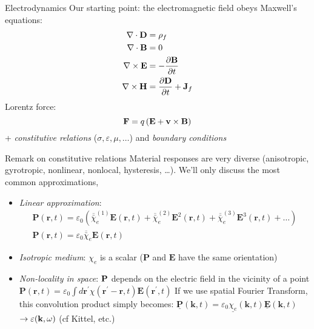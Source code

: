 \documentclass{article}
\providecommand{\tightlist}{}
\begin{document}
\begin{frame}{Electrodynamics}
\protect\hypertarget{electrodynamics}{}
Our starting point: the electromagnetic field obeys Maxwell's equations:
\[
\begin{aligned}
\nabla\cdot\mathbf{D} &= \rho_f\\
\nabla\cdot\mathbf{B} &= 0\\
\nabla\times\mathbf{E} &= -\frac{\partial\mathbf{B}}{\partial t}\\
\nabla\times\mathbf{H} &= \frac{\partial\mathbf{D}}{\partial t} + \mathbf{J}_f
\end{aligned}
\] Lorentz force: \[
\mathbf{F} = q\left(\mathbf{E} + \mathbf{v} \times \mathbf{B}\right)
\] + \emph{constitutive relations} (\(\sigma, \varepsilon, \mu,\dots\))
and \emph{boundary conditions}
\end{frame}

\begin{frame}{Remark on constitutive relations}
\protect\hypertarget{remark-on-constitutive-relations}{}
Material responses are very diverse (anisotropic, gyrotropic, nonlinear,
nonlocal, hysteresis, \dots). We'll only discuss the most common
approximations,

\begin{itemize}
\tightlist
\item
  \emph{Linear approximation}: \[
  \begin{array}{l}
  \mathbf{P}(\mathbf{r}, t)=\varepsilon_{0}\left(\overline{\bar{\chi}}_{e}^{(1)} \mathbf{E}(\mathbf{r}, t)+\overline{\bar{\chi}}_{e}^{(2)} \mathbf{E}^{2}(\mathbf{r}, t)+\overline{\bar{\chi}}_{e}^{(3)} \mathbf{E}^{3}(\mathbf{r}, t)+\ldots\right) \\
  \mathbf{P}(\mathbf{r}, t)=\varepsilon_{0} \overline{\bar{\chi}}_{e} \mathbf{E}(\mathbf{r}, t)
  \end{array}
  \]
\item
  \emph{Isotropic medium}: \(\chi_e\) is a scalar (\(\mathbf{P}\) and
  \(\mathbf{E}\) have the same orientation)
\item
  \emph{Non-locality in space}: \(\mathbf{P}\) depends on the electric field
  in the vicinity of a point
  \(\mathbf{P}(\mathbf{r}, t)=\varepsilon_{0} \int d \mathbf{r}^{\prime} \chi\left(\mathbf{r}^{\prime}-\mathbf{r}, t\right) \mathbf{E}\left(\mathbf{r}^{\prime}, t\right)\)
  If we use spatial Fourier Transform, this convolution product simply
  becomes:
  \(\underline{\mathbf{P}}(\mathbf{k}, t)=\varepsilon_{0} \underline{\chi_{e}}(\mathbf{k}, t) \underline{\mathbf{E}}(\mathbf{k}, t)\)
  \(\to \varepsilon(\mathbf{k},\omega)\) (cf Kittel, etc.)
\end{itemize}
\end{frame}
\end{document}
